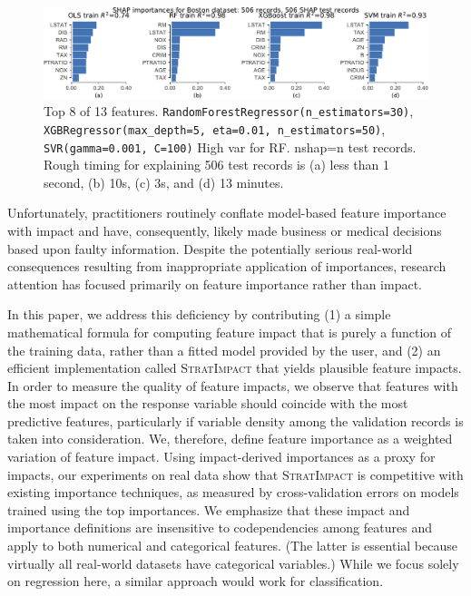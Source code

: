 \documentclass[11pt]{article}
\newcommand{\simp}{\fontfamily{cmr}\textsc{\small StratImpact}}
\begin{document}
\begin{figure}[htbp]
\begin{center}
\includegraphics[scale=0.6]{images/diff-models.pdf}
\caption{Top 8 of 13 features. {\tt\footnotesize RandomForestRegressor(n\_estimators=30)}, {\tt\footnotesize XGBRegressor(max\_depth=5, eta=0.01, n\_estimators=50)}, {\tt\footnotesize SVR(gamma=0.001, C=100)} High var for RF. nshap=n test records. Rough timing for explaining 506 test records is (a) less than 1 second, (b) 10s, (c) 3s, and (d) 13 minutes.}
\label{fig:diff-models}
\end{center}
\end{figure}

Unfortunately, practitioners routinely conflate model-based feature importance with impact and have, consequently, likely made business or medical decisions based upon faulty information. Despite the potentially serious real-world consequences resulting from inappropriate application of importances, research attention has focused primarily on feature importance rather than impact. 

In this paper, we address this deficiency by contributing (1) a simple mathematical formula for computing feature impact that is purely a function of the training data, rather than a fitted model  provided by the user, and (2) an efficient implementation called \simp{} that yields plausible feature impacts.   In order to measure the quality of feature impacts, we observe that features with the most impact on the response variable should coincide with the most predictive features, particularly if variable density among the validation records is taken into consideration. We, therefore, define feature importance as a weighted variation of feature impact. Using impact-derived importances as a proxy for impacts, our experiments on real data show that \simp{} is competitive with existing importance techniques, as measured by cross-validation errors on models trained using the top importances.   We emphasize that these impact and importance definitions are insensitive to codependencies among features and apply to both numerical and categorical features.  (The latter is essential because virtually all real-world datasets have categorical variables.) While we focus solely on regression here, a similar approach would work for classification.
\end{document}

